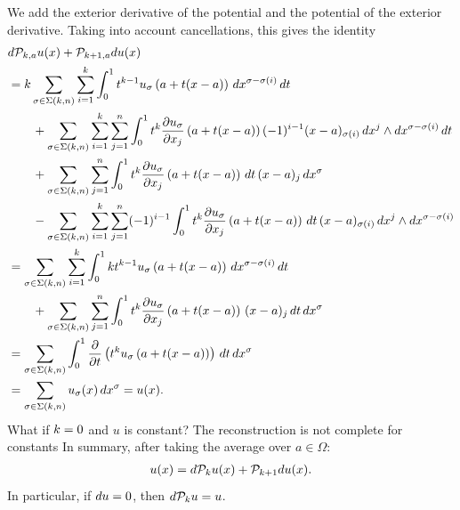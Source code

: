 \documentclass[10pt,a4paper]{article}
\newcommand{\mwl}[1]{{\color{red}#1}}
\begin{document}
We add the exterior derivative of the potential and the potential of the exterior derivative.
Taking into account cancellations, this gives the identity 
\begin{align*}
    &
    d {\mathcal P}_{k,a} u(x)
    +
    {\mathcal P}_{k+1,a} d u(x)
    \\&
    =
    k
    \sum_{\sigma \in \Sigma(k,n)} \sum_{i=1}^{k}
    \int_{0}^{1} 
    t^{k-1} u_{\sigma}\left(a+t(x-a)\right) \,dx^{\sigma-\sigma(i)} \,dt 
    \\&\qquad
    + 
    \sum_{\sigma \in \Sigma(k,n)} \sum_{i=1}^{k} \sum_{j=1}^{n}
    \int_{0}^{1} 
    t^{k} \frac{ \partial u_{\sigma} }{\partial x_{j}}\left(a+t(x-a)\right) (-1)^{i-1} (x-a)_{\sigma(i) } \,dx^{j} \wedge dx^{\sigma-\sigma(i)} \,dt 
    \\&\qquad
    +
    \sum_{\sigma \in \Sigma(k,n)} \sum_{j=1}^{n}
    \int_{0}^{1} t^{k} \frac{ \partial u_{\sigma} }{\partial x_{j}}\left(a+t(x-a)\right) \,dt \,(x-a)_{j} \,dx^{\sigma}
    \\&\qquad
    - 
    \sum_{\sigma \in \Sigma(k,n)} \sum_{i=1}^{k} \sum_{j=1}^{n}
    (-1)^{i-1}
    \int_{0}^{1} t^{k} \frac{ \partial u_{\sigma} }{\partial x_{j}}\left(a+t(x-a)\right) \,dt 
    \,(x-a)_{\sigma(i)} \,dx^{j} \wedge dx^{\sigma-\sigma(i)}
    \\&
    =
    \sum_{\sigma \in \Sigma(k,n)} \sum_{i=1}^{k}
    \int_{0}^{1} 
    k t^{k-1} u_{\sigma}\left(a+t(x-a)\right) \,dx^{\sigma-\sigma(i)} \,dt 
    \\&\qquad
    +
    \sum_{\sigma \in \Sigma(k,n)} \sum_{j=1}^{n}
    \int_{0}^{1} t^{k} \frac{ \partial u_{\sigma} }{\partial x_{j}}\left(a+t(x-a)\right) \,(x-a)_{j} \,dt \,dx^{\sigma}
    \\&
    =
    \sum_{\sigma \in \Sigma(k,n)} 
    \int_{0}^{1} \frac{\partial}{\partial t} \left( t^{k} u_{\sigma}\left(a+t(x-a)\right) \right) \,dt \,dx^{\sigma}
    \\&
    =
    \sum_{\sigma \in \Sigma(k,n)} 
    u_{\sigma}(x) \,dx^{\sigma}
    =
    u(x)
    .
\end{align*}
\mwl{What if $k = 0$ and $u$ is constant? The reconstruction is not complete for constants}
In summary, after taking the average over $a \in \Omega$:
\begin{align*}
    u(x) = d {\mathcal P}_{k} u(x) + {\mathcal P}_{k+1} d u(x).
\end{align*}
In particular, if $d u = 0$, then $d {\mathcal P}_{k} u = u$.
\end{document}
